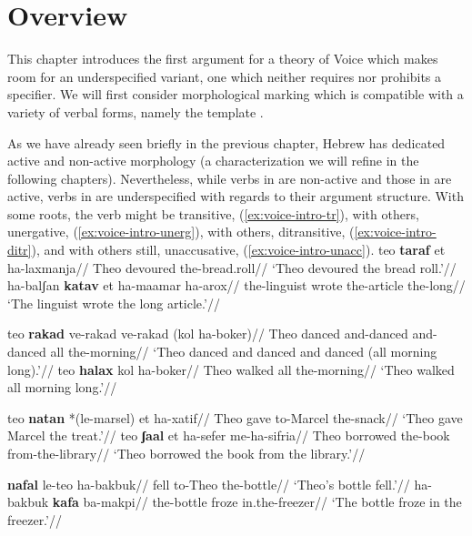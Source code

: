 \label{chap:voice}
\section{Overview} \label{voice:intro}
This chapter introduces the first argument for a theory of Voice which makes room for an underspecified variant, one which neither requires nor prohibits a specifier. We will first consider morphological marking which is compatible with a variety of verbal forms, namely the template {\tkal}.

As we have already seen briefly in the previous chapter, Hebrew has dedicated active and non-active morphology (a characterization we will refine in the following chapters). Nevertheless, while verbs in {\tnif} are non-active and those in {\thif} are active, verbs in {\tkal} are underspecified with regards to their argument structure. With some roots, the verb might be transitive, (\ref{ex:voice-intro-tr}), with others, unergative, (\ref{ex:voice-intro-unerg}), with others, ditransitive, (\ref{ex:voice-intro-ditr}), and with others still, unaccusative, (\ref{ex:voice-intro-unacc}).
\pex\label{ex:voice-intro-tr}
	\a \begingl
		\gla teo \textbf{taraf} et ha-laxmanja//
		\glb Theo devoured  the-bread.roll//
		\glft `Theo devoured the bread roll.'//
	\endgl
	\a \begingl
		\gla ha-balʃan \textbf{katav} et ha-maamar ha-arox//
		\glb the-linguist wrote  the-article the-long//
		\glft `The linguist wrote the long article.'//
	\endgl
\xe

\pex\label{ex:voice-intro-unerg}
	\a \begingl
		\gla teo \textbf{rakad} ve-rakad ve-rakad (kol ha-boker)//
		\glb Theo danced and-danced and-danced all the-morning//
		\glft `Theo danced and danced and danced (all morning long).'//
	\endgl
	\a \begingl
		\gla teo \textbf{halax} kol ha-boker//
		\glb Theo walked all the-morning//
		\glft `Theo walked all morning long.'//
	\endgl
\xe

\pex\label{ex:voice-intro-ditr}
	\a \begingl
		\gla teo \textbf{natan} *(le-marsel) et ha-xatif//
		\glb Theo gave to-Marcel   the-snack//
		\glft `Theo gave Marcel the treat.'//
	\endgl
	\a \begingl
		\gla teo \textbf{ʃaal} et ha-sefer me-ha-sifria//
		\glb Theo borrowed  the-book from-the-library//
		\glft `Theo borrowed the book from the library.'//
	\endgl
\xe

\pex\label{ex:voice-intro-unacc}
	\a \begingl
		\gla \textbf{nafal} le-teo ha-bakbuk//
		\glb fell to-Theo the-bottle//
		\glft `Theo's bottle fell.'//
	\endgl
	\a \begingl
		\gla ha-bakbuk \textbf{kafa} ba-makpi//
		\glb the-bottle froze in.the-freezer//
		\glft `The bottle froze in the freezer.'//
	\endgl
\xe

